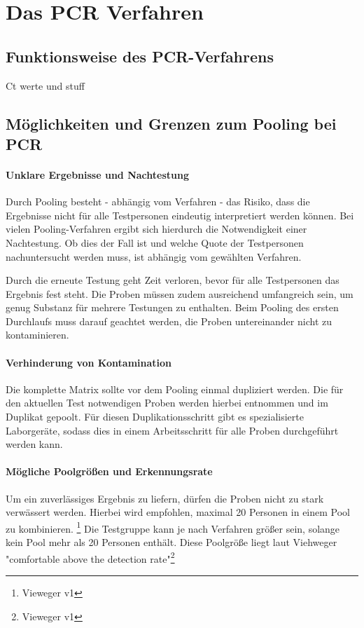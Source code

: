 \chapter{Das PCR Verfahren}
\section{Funktionsweise des PCR-Verfahrens}
Ct werte und stuff

\cleardoublepage

\section{Möglichkeiten und Grenzen zum Pooling bei PCR}
\subsubsection{Unklare Ergebnisse und Nachtestung}
Durch Pooling besteht - abhängig vom Verfahren - das Risiko, dass die Ergebnisse nicht für alle Testpersonen eindeutig interpretiert werden können.
Bei vielen Pooling-Verfahren ergibt sich hierdurch die Notwendigkeit einer Nachtestung.
Ob dies der Fall ist und welche Quote der Testpersonen nachuntersucht werden muss, ist abhängig vom gewählten Verfahren.

Durch die erneute Testung geht Zeit verloren, bevor für alle Testpersonen das Ergebnis fest steht.
Die Proben müssen zudem ausreichend umfangreich sein, um genug Substanz für mehrere Testungen zu enthalten.
Beim Pooling des ersten Durchlaufs muss darauf geachtet werden, die Proben untereinander nicht zu kontaminieren.

\subsubsection{Verhinderung von Kontamination}
Die komplette Matrix sollte vor dem Pooling einmal dupliziert werden. 
Die für den aktuellen Test notwendigen Proben werden hierbei entnommen und im Duplikat gepoolt.
Für diesen Duplikationsschritt gibt es spezialisierte Laborgeräte, sodass dies in einem Arbeitsschritt für alle Proben durchgeführt werden kann.

\subsubsection{Mögliche Poolgrößen und Erkennungsrate}
Um ein zuverlässiges Ergebnis zu liefern, dürfen die Proben nicht zu stark verwässert werden.
Hierbei wird empfohlen, maximal 20 Personen in einem Pool zu kombinieren. \footnote{Vieweger v1}
Die Testgruppe kann je nach Verfahren größer sein, solange kein Pool mehr als 20 Personen enthält.
Diese Poolgröße liegt laut Viehweger "comfortable above the detection rate"\footnote{Vieweger v1}

